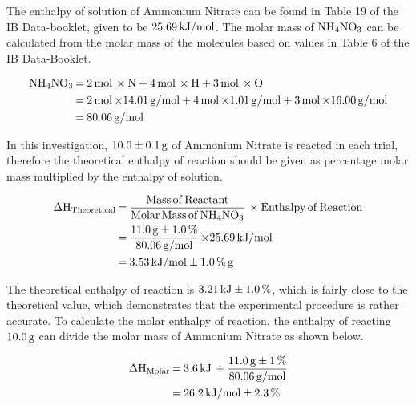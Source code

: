 \documentclass{article}
\begin{document}
\noindent
The enthalpy of solution of Ammonium Nitrate can be found in Table 19 of the IB Data-booklet, given to be $\ce{25.69 kJ/mol}$. The molar mass of $\ce{NH4NO3}$ can be calculated from the molar mass of the molecules based on values in Table 6 of the IB Data-Booklet.
\begin{tcolorbox}[title=Calculation of Molar Mass of $\ce{NH4No3}$]
\begin{equation}
    \begin{split}
        \ce{
        NH4NO3 &= 2 mol \times N + 4 mol \times H + 3mol \times O \\
        &= 2 mol \times} \ce{14.01 \si{g/mol} + 4mol \times} \ce{1.01 \si{g/mol} + 3mol \times} \ce{16.00 \si{g/mol} \\
        &= 80.06 \si{g/mol}
        }
    \end{split}
\end{equation}
\end{tcolorbox}
\noindent
In this investigation, $\ce{10.0 \pm 0.1 g}$ of Ammonium Nitrate is reacted in each trial, therefore the theoretical enthalpy of reaction should be given as percentage molar mass multiplied by the enthalpy of solution.
\begin{tcolorbox}[title=Calculation of Theoretical Enthalpy of Reaction ($\ce{\Delta H_{Theoretical}}$)]
\begin{equation}
\begin{split}
  \ce{
  \Delta H_{Theoretical} &= \frac{Mass of Reactant}{Molar Mass of NH4NO3} \times Enthalpy of Reaction \\
  &= \frac{11.0 g \pm 1.0\%}{80.06 g/mol} \times} \ce{25.69 kJ/mol \\
  &= 3.53 kJ/mol \pm} \ce{1.0\% g
  }  
\end{split}
\end{equation}
\end{tcolorbox}
\noindent
The theoretical enthalpy of reaction is $\ce{3.21 kJ \pm 1.0\%}$, which is fairly close to the theoretical value, which demonstrates that the experimental procedure is rather accurate. To calculate the molar enthalpy of reaction, the enthalpy of reacting $\ce{10.0g}$ can divide the molar mass of Ammonium Nitrate as shown below.
\begin{tcolorbox}[title=Calculation of Molar Enthalpy of Reaction ($\ce{\Delta H_{Molar}}$)]
\begin{equation}
    \begin{split}
        \ce{
        \Delta H_{Molar} &= 3.6 kJ \div \frac{11.0 g \pm 1\%}{80.06 g/mol} \\ 
        &= 26.2 kJ/mol \pm 2.3\%
        }
    \end{split}
\end{equation}
\end{tcolorbox}
\end{document}
